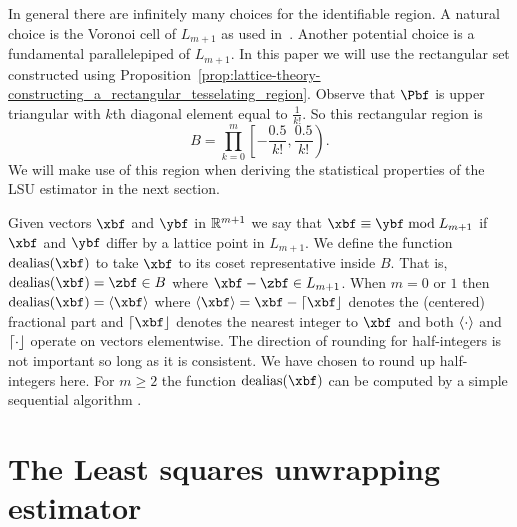 \documentclass[journal]{IEEEtran}
\begin{document}
In general there are infinitely many choices for the identifiable region. A natural choice is the Voronoi cell of $L_{m+1}$ as used in~\cite{McKilliam2009IndentifiabliltyAliasingPolyphase}. Another potential choice is a fundamental parallelepiped of $L_{m+1}$. In this paper we will use the rectangular set constructed using Proposition~\ref{prop:lattice-theory-constructing_a_rectangular_tesselating_region}. Observe that $\Pbf$ is upper triangular with $k$th diagonal element equal to $\tfrac{1}{k!}$.  So this rectangular region is
\begin{equation}\label{eq:rectangular_identifiable_region}
B = \prod_{k=0}^{m}\left[ -\frac{0.5}{k!}, \frac{0.5}{k!}  \right).
\end{equation}
We will make use of this region when deriving the statistical properties of the LSU estimator in the next section. 

Given vectors $\xbf$ and $\ybf$ in ${\mathbb R}^{m+1}$ we say that $\xbf \equiv \ybf \bmod L_{m+1}$ if $\xbf$ and $\ybf$ differ by a lattice point in $L_{m+1}$.  We define the function $\dealias(\xbf)$ to take $\xbf$ to its coset representative inside $B$. That is, $\dealias(\xbf) = \zbf \in B$ where $\xbf - \zbf \in L_{m+1}$.  %
When $m = 0$ or $1$ then $\dealias(\xbf) = \fracpart{\xbf}$ where $\fracpart{\xbf} = \xbf - \round{\xbf}$ denotes the (centered) fractional part and $\round{\xbf}$ denotes the nearest integer to $\xbf$ and both $\left\langle \cdot \right\rangle$ and ${\left\lceil \cdot \right\rfloor}$ operate on vectors elementwise.  The direction of rounding for half-integers is not important so long as it is consistent.  We have chosen to round up half-integers here.  For $m \geq 2$ the function $\dealias(\xbf)$ can be computed by a simple sequential algorithm \cite[Sec. 7.2.1]{McKilliam2010thesis}.

\section{The Least squares unwrapping estimator}\label{sec:least-squar-unwr}
\end{document}
